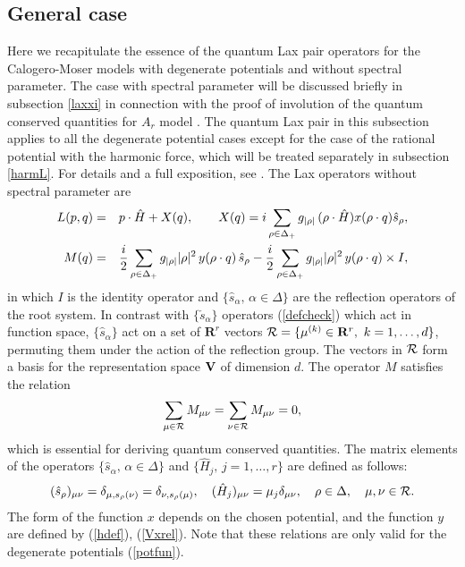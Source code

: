 \documentclass[a4paper,12pt]{article}
\begin{document}
\subsection{General case}
\label{genconv}
Here we recapitulate the essence of the quantum
Lax pair operators for the Calogero-Moser models with
degenerate potentials and without spectral parameter.
The case with spectral parameter will be discussed briefly in
subsection \ref{laxxi} in connection with the proof of involution of
the quantum conserved quantities for \(A_r\) model \cite{Pol}.
 The quantum Lax pair in this subsection applies
to all the degenerate potential
cases except for the case of the rational potential with the harmonic force,
which will be treated separately in subsection \ref{harmL}.
For details and a full exposition, see \cite{bms}.
The Lax operators without spectral parameter  are
\begin{eqnarray}
   L(p,q) &=& p\cdot\hat{H}+X(q),\qquad X(q)=
   i\sum_{\rho\in\Delta_{+}}g_{|\rho|}
   \,(\rho\cdot\hat{H})x(\rho\cdot
q)\hat{s}_{\rho},
   \label{LaxOpDef}\\
   M(q) &=&
   {i\over2}\sum_{\rho\in\Delta_{+}}g_{|\rho|}|\rho|^2\,y
   (\rho\cdot
q)\,\hat{s}_{\rho}-{i\over2}\sum_{\rho\in\Delta_{+}}g_{|\rho|}|\rho|^2\,y
   (\rho\cdot q)\times I,
   \label{Mtildef}
\end{eqnarray}
in which \(I\) is the identity
operator and \(\{\hat{s}_{\alpha},\,\alpha\in\Delta\}\) are the reflection
operators  of the root system.
In contrast with $\{\check{s}_{\alpha}\}$ operators
(\ref{defcheck}) which act in function space,
\(\{\hat{s}_{\alpha}\}\) act on a set of
\(\mathbf{R}^{r}\) vectors
\({\cal R}=\{\mu^{(k)}\in\mathbf{R}^{r},\ k=1,\ldots, d\}\), permuting them
under the action of the reflection group.
The vectors in \(\cal R\) form a basis for
the representation space \(\bf V\) of dimension \(d\).
The operator \(M\) satisfies the relation
\begin{equation}
   \sum_{\mu\in{\cal R}}M_{\mu\nu}=
   \sum_{\nu\in{\cal R}}M_{\mu\nu}=0,
   \label{sumMzero}
\end{equation}
which is essential for deriving quantum conserved quantities.
The matrix elements of the operators
\(\{\hat{s}_{\alpha},\,\alpha\in\Delta\}\) and \(\{\hat{H}_{j},\,j=1,\ldots,
r\}\) are defined as follows:
\begin{equation}
   (\hat{s}_{\rho})_{\mu\nu}=\delta_{\mu,s_\rho(\nu)}=
      \delta_{\nu,s_\rho(\mu)}, \quad
   (\hat{H}_{j})_{\mu\nu}=\mu_j\delta_{\mu\nu},\quad \rho\in\Delta,
   \quad
   \mu, \nu\in{\cal R}.
   \label{sHdef}
\end{equation}
The form of the function \(x\) depends on the chosen potential, and
the function \(y\)  are defined by (\ref{hdef}), (\ref{Vxrel}).
Note that these relations are only valid for the degenerate potentials
(\ref{potfun}).
\end{document}
